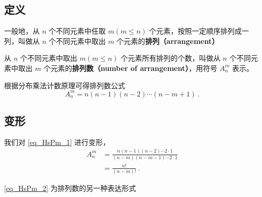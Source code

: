 
\begin{issues}
\end{issues}


\subsection{定义}
一般地，从 $n$ 个不同元素中任取 $m(m \leq n)$ 个元素，按照一定顺序排列成一列，叫做从 $n$ 个不同元素中取出 $m$ 个元素的\textbf{排列（arrangement）}

从 $n$ 个不同元素中取出 $m(m \leq n)$ 个元素所有排列的个数，叫做从 $n$ 个不同元素中取出 $m$ 个元素的\textbf{排列数（number of arrangement）}，用符号 $A_n^m$ 表示。

根据分布乘法计数原理可得排列数公式\begin{equation}\label{eq_HsPm_1}
A_n^m = n (n - 1)(n - 2) \cdots (n - m + 1)~.
\end{equation}

\subsection{变形}
我们对 \autoref{eq_HsPm_1} 进行变形，\begin{equation}\label{eq_HsPm_2}
\begin{aligned}
A_n^m &= \frac{n(n - 1)(n - 2) \cdots 2 \cdot 1}{(n - m)(n - m - 1) \cdots 2 \cdot 1}\\
&= \frac{n!}{(n - m)!}~.
\end{aligned}
\end{equation}

\autoref{eq_HsPm_2} 为排列数的另一种表达形式